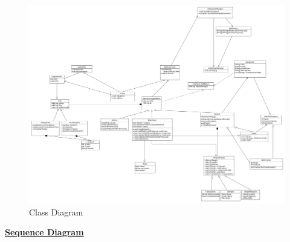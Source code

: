 \documentclass[]{article}
\begin{document}
\begin{figure}[H]
\centering
\includegraphics[scale=0.22]{./classdiagram}
\caption{Class Diagram}
\end{figure}


\textbf{\underline{Sequence Diagram}}
\end{document}

